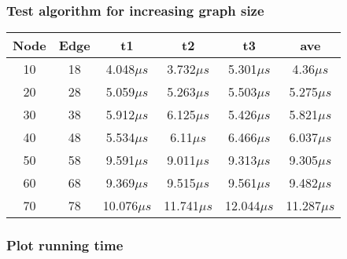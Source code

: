 \documentclass{article}
\begin{document}
\subsubsection{Test algorithm for increasing graph size}
\begin{tabular}{cccccc}
\hline
Node & Edge & t1 & t2 & t3 & ave\\
\hline
10 & 18 & 4.048$\mu s$ & 3.732$\mu s$ & 5.301$\mu s$ &  4.36$\mu s$ \\
\hline
20 & 28 &  5.059$\mu s$ & 5.263$\mu s$ & 5.503$\mu s$ & 5.275$\mu s$ \\
\hline
30 & 38 &  5.912$\mu s$ & 6.125$\mu s$ & 5.426$\mu s$ & 5.821$\mu s$ \\
\hline
40 & 48 &  5.534$\mu s$ & 6.11$\mu s$ & 6.466$\mu s$ & 6.037$\mu s$ \\
\hline
50 & 58 & 9.591$\mu s$ & 9.011$\mu s$ & 9.313$\mu s$ & 9.305$\mu s$ \\
\hline
60 & 68 & 9.369$\mu s$ & 9.515$\mu s$ & 9.561$\mu s$ & 9.482$\mu s$ \\
\hline
70 & 78 & 10.076$\mu s$ & 11.741$\mu s$ & 12.044$\mu s$ & 11.287$\mu s$ \\
\hline
\end{tabular}

\subsubsection{Plot running time}
\end{document}
